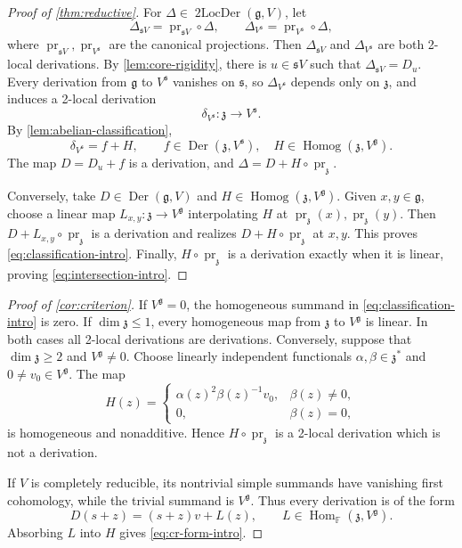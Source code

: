 \documentclass[12pt,reqno]{amsart}
\theoremstyle{definition}
\theoremstyle{remark}
\numberwithin{equation}{section}
\newcommand{\F}{\mathbb{F}}
\newcommand{\g}{\mathfrak{g}}
\newcommand{\s}{\mathfrak{s}}
\newcommand{\z}{\mathfrak{z}}
\newcommand{\Der}{\operatorname{Der}}
\newcommand{\Homog}{\operatorname{Homog}}
\newcommand{\prz}{\operatorname{pr}_{\z}}
\begin{document}
\begin{proof}[Proof of \cref{thm:reductive}]
For \(\Delta\in \operatorname{2LocDer}(\g,V)\), let
\[
\Delta_{\s V}= \operatorname{pr}_{\s V}\circ\Delta, \qquad\Delta_{V^\s}= \operatorname{pr}_{V^\s}\circ\Delta,
\]
where \(\operatorname{pr}_{\s V}, \operatorname{pr}_{V^\s}\) are the canonical projections.
Then \(\Delta_{\s V}\) and \(\Delta_{V^\s}\) are both 2-local derivations.
By \cref{lem:core-rigidity}, there is \(u\in \s V\) such that
\(\Delta_{\s V}=D_u\).  Every derivation from \(\g\) to \(V^\s\) vanishes on \(\s\), so
\(\Delta_{V^\s}\) depends only on \(\z\), and induces a 2-local derivation
\[
 \delta_{V^\s}\colon\z\longrightarrow V^\s.
\]
By \cref{lem:abelian-classification},
\[
 \delta_{V^\s}=f+H,\qquad
 f\in\Der(\z,{V^\s}),\quad
 H\in\Homog(\z,V^\g).
\]
The map \(D=D_u+f\) is a derivation, and \(\Delta=D+H\circ\prz\).

Conversely, take \(D\in\Der(\g,V)\) and
\(H\in\Homog(\z,V^\g)\).  Given \(x,y\in\g\), choose a linear map
\(L_{x,y}\colon\z\to V^\g\) interpolating \(H\) at
\(\prz(x),\prz(y)\).  Then \(D+L_{x,y}\circ\prz\)
is a derivation and realizes \(D+H\circ\prz\) at \(x,y\).  This proves
\eqref{eq:classification-intro}.  Finally, \(H\circ\prz\) is a derivation
exactly when it is linear, proving \eqref{eq:intersection-intro}.
\end{proof}

\begin{proof}[Proof of \cref{cor:criterion}]
If \(V^\g=0\), the homogeneous summand in
\eqref{eq:classification-intro} is zero.  If \(\dim\z\leq1\), every
homogeneous map from \(\z\) to \(V^\g\) is linear.  In both cases all 2-local
derivations are derivations.
Conversely, suppose that \(\dim\z\ge2\) and \(V^\g\ne0\).  Choose linearly
independent functionals \(\alpha,\beta\in\z^*\) and \(0\ne v_0\in V^\g\).
The map
\[
 H(z)=
 \begin{cases}
   \alpha(z)^2\beta(z)^{-1}v_0,&\beta(z)\ne0,\\
   0,&\beta(z)=0,
 \end{cases}
\]
is homogeneous and nonadditive.  Hence \(H\circ\prz\) is a 2-local
derivation which is not a derivation.

If \(V\) is completely reducible, its nontrivial simple summands have
vanishing first cohomology, while the trivial summand is \(V^\g\).  Thus
every derivation is of the form
\[
 D(s+z)=(s+z)v+L(z),
 \qquad L\in\operatorname{Hom}_{\F}(\z,V^\g).
\]
Absorbing \(L\) into \(H\) gives \eqref{eq:cr-form-intro}.
\end{proof}
\end{document}
